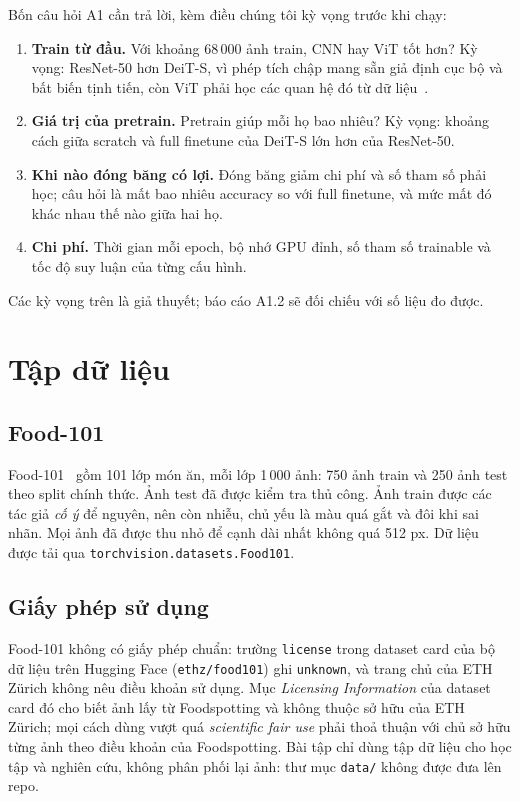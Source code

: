 Bốn câu hỏi A1 cần trả lời, kèm điều chúng tôi kỳ vọng trước khi chạy:
\begin{enumerate}
\item \textbf{Train từ đầu.} Với khoảng 68\,000 ảnh train, CNN hay ViT tốt hơn? Kỳ vọng: ResNet-50 hơn DeiT-S, vì phép tích chập mang sẵn giả định cục bộ và bất biến tịnh tiến, còn ViT phải học các quan hệ đó từ dữ liệu~\cite{dosovitskiy2021vit,touvron2021deit}.
\item \textbf{Giá trị của pretrain.} Pretrain giúp mỗi họ bao nhiêu? Kỳ vọng: khoảng cách giữa scratch và full finetune của DeiT-S lớn hơn của ResNet-50.
\item \textbf{Khi nào đóng băng có lợi.} Đóng băng giảm chi phí và số tham số phải học; câu hỏi là mất bao nhiêu accuracy so với full finetune, và mức mất đó khác nhau thế nào giữa hai họ.
\item \textbf{Chi phí.} Thời gian mỗi epoch, bộ nhớ GPU đỉnh, số tham số trainable và tốc độ suy luận của từng cấu hình.
\end{enumerate}
Các kỳ vọng trên là giả thuyết; báo cáo A1.2 sẽ đối chiếu với số liệu đo được.

\section{Tập dữ liệu}\label{sec:a1-dataset}

\subsection{Food-101}
Food-101~\cite{bossard2014food101} gồm 101 lớp món ăn, mỗi lớp 1\,000 ảnh: 750 ảnh train và 250 ảnh test theo split chính thức. Ảnh test đã được kiểm tra thủ công. Ảnh train được các tác giả \emph{cố ý} để nguyên, nên còn nhiễu, chủ yếu là màu quá gắt và đôi khi sai nhãn. Mọi ảnh đã được thu nhỏ để cạnh dài nhất không quá 512 px. Dữ liệu được tải qua \texttt{torchvision.datasets.Food101}.

\subsection{Giấy phép sử dụng}\label{sec:a1-license}
Food-101 không có giấy phép chuẩn: trường \texttt{license} trong dataset card của bộ dữ liệu trên Hugging Face (\texttt{ethz/food101}) ghi \texttt{unknown}, và trang chủ của ETH Zürich không nêu điều khoản sử dụng. Mục \emph{Licensing Information} của dataset card đó cho biết ảnh lấy từ Foodspotting và không thuộc sở hữu của ETH Zürich; mọi cách dùng vượt quá \emph{scientific fair use} phải thoả thuận với chủ sở hữu từng ảnh theo điều khoản của Foodspotting. Bài tập chỉ dùng tập dữ liệu cho học tập và nghiên cứu, không phân phối lại ảnh: thư mục \texttt{data/} không được đưa lên repo.

